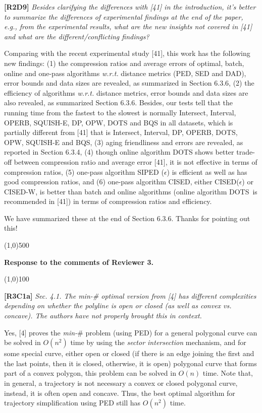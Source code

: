 \documentclass{letter}
\newcommand{\wrt}{\emph{w.r.t.}\xspace}
\begin{document}
{{\textbf{[R2D9]} \emph{Besides clarifying the differences with [41] in the introduction, it’s better to summarize the differences of experimental findings at the end of the paper, e.g., from the experimental results, what are the new insights not covered in [41] and what are the different/conflicting findings?}

Comparing with the recent experimental study [41], this work has the following new findings: 
(1) the compression ratios and average errors of optimal, batch, online and one-pass algorithms \wrt distance metrics (PED, SED and DAD), error bounds and data sizes are revealed, as summarized in Section 6.3.6, 
(2) the efficiency of algorithms \wrt distance metrics, error bounds and data sizes are also revealed, as summarized Section 6.3.6. Besides, our tests tell that the running time from the fastest to the slowest is normally Intersect, Interval, OPERB, SQUISH-E, DP, OPW, DOTS and BQS in all datasets, which is partially different from [41] that is Intersect, Interval, DP, OPERB, DOTS, OPW, SQUISH-E and BQS, 
(3) aging friendliness and errors are revealed, as reported in Section 6.3.4,
(4) though online algorithm DOTS shows better trade-off between compression ratio and average error [41], it is not effective in terms of compression ratios,  
(5) one-pass algorithm SIPED ($\epsilon$) is efficient as well as has good compression ratios, and 
(6) one-pass algorithm CISED, either CISED($\epsilon$) or CISED-W, is better than batch and online algorithms (online algorithm DOTS~is recommended in [41]) in terms of compression ratios and efficiency.

We have summarized these at the end of Section 6.3.6. Thanks for pointing out this!


\line(1,0){500}

\textbf{Response to the comments of Reviewer 3.}

\line(1,0){100}

\textbf{[R3C1a]} \emph{
Sec. 4.1. The min-\# optimal version from [4] has different complexities depending on whether the polyline is open or closed (as well as convex vs. concave). The authors have not properly brought this in context.}

Yes, [4] proves the \emph{min-$\#$} problem (using PED) for a general polygonal curve can be solved in $O(n^2)$ time by using the \textit{sector intersection} mechanism, and for some special curve, either open or closed (if there is an edge joining the first and the last points, then it is closed, otherwise, it is open) polygonal curve that forms part of a convex polygon, this problem can be solved in $O(n)$ time. Note that, in general, a trajectory is not necessary a convex or closed polygonal curve, instead, it is often open and concave. Thus, the best optimal algorithm for trajectory simplification using PED still has $O(n^2)$ time.} 

}
\end{document}
